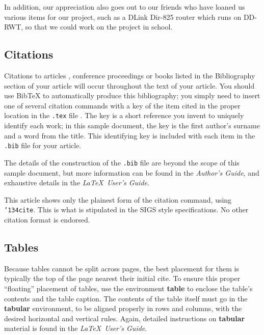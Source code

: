 \documentclass{acm_proc_article-sp}
\begin{document}
In addition, our appreciation also goes out to our friends who have loaned us various items for our project, such as a DLink Dir-825 router which runs on DD-RWT, so that we could work on the project in school. 

%

%
%

\subsection{Citations}
Citations to articles \cite{bowman:reasoning, clark:pct, braams:babel, herlihy:methodology},
conference
proceedings \cite{clark:pct} or books \cite{salas:calculus, Lamport:LaTeX} listed
in the Bibliography section of your
article will occur throughout the text of your article.
You should use BibTeX to automatically produce this bibliography;
you simply need to insert one of several citation commands with
a key of the item cited in the proper location in
the \texttt{.tex} file \cite{Lamport:LaTeX}.
The key is a short reference you invent to uniquely
identify each work; in this sample document, the key is
the first author's surname and a
word from the title.  This identifying key is included
with each item in the \texttt{.bib} file for your article.

The details of the construction of the \texttt{.bib} file
are beyond the scope of this sample document, but more
information can be found in the \textit{Author's Guide},
and exhaustive details in the \textit{\LaTeX\ User's
Guide}\cite{Lamport:LaTeX}.

This article shows only the plainest form
of the citation command, using \texttt{{\char'134}cite}.
This is what is stipulated in the SIGS style specifications.
No other citation format is endorsed.

\subsection{Tables}
Because tables cannot be split across pages, the best
placement for them is typically the top of the page
nearest their initial cite.  To
ensure this proper ``floating'' placement of tables, use the
environment \textbf{table} to enclose the table's contents and
the table caption.  The contents of the table itself must go
in the \textbf{tabular} environment, to
be aligned properly in rows and columns, with the desired
horizontal and vertical rules.  Again, detailed instructions
on \textbf{tabular} material
is found in the \textit{\LaTeX\ User's Guide}.
\end{document}
